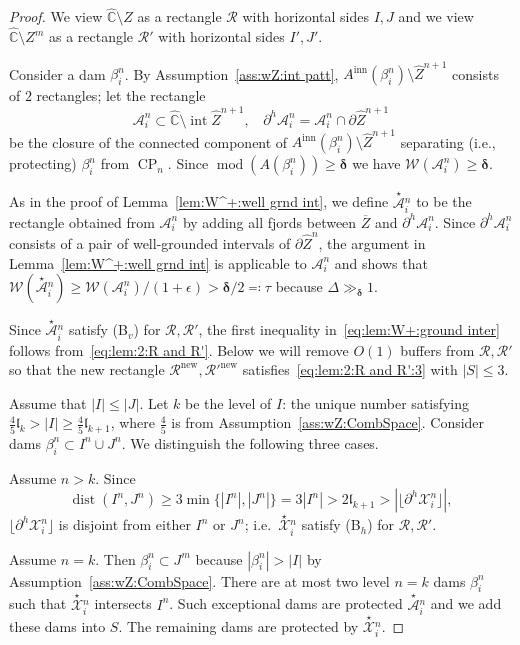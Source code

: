 \documentclass{amsart}
\renewcommand{\sp}{{\ \ }}
\newcommand{\1}{{\mathbb 1 }}
\newcommand{\upstar}[1]{\overset{\star}{ #1}{}}
\newcommand{\Width}{{\mathcal W}}
\newcommand{\bDelta}{{\mathbb{\Delta}}}
\newcommand\RR{\mathcal{R}}
\newcommand\XX{\mathcal{X}}
\newcommand\intr{\operatorname{int}}
\newcommand{\wZ}{{\widehat Z}}
\newcommand{\length}{{\mathfrak l}}
\newcommand\inn{{\operatorname{inn}}}
\renewcommand\AA{\mathcal{A}}
\newcommand\new{{\operatorname{new}}}
\newcommand{\wC}{\widehat{\mathbb{C}}}
\theoremstyle{remark}
\numberwithin{equation}{section}
\theoremstyle{definition}
\newcommand{\dist}{\operatorname{dist}}
\renewcommand{\mod}{\operatorname{mod}}
\newcommand{\CP}{{\operatorname{CP}}}
\newcommand{\bdelta}{{\boldsymbol{ \delta}}}
\begin{document}
\begin{proof}We view $\wC\setminus Z$ as a rectangle $\RR$ with horizontal sides $I,J$ and we view $\wC\setminus Z^m$ as a rectangle $\RR'$ with horizontal sides $I',J'$.

Consider a dam $\beta^n_i$. By Assumption~\ref{ass:wZ:int patt}, $A^\inn(\beta^n_i)\setminus \wZ^{n+1}$ consists of $2$ rectangles; let the rectangle \[\AA^n_i\subset \wC\setminus \intr \wZ^{n+1},\sp\sp \partial^h \AA^n_i=\AA^n_i\cap \partial \wZ^{n+1}\]
be the closure of the connected component of $A^\inn(\beta^n_i)\setminus \wZ^{n+1}$ separating (i.e., protecting) $\beta^n_i$ from $\CP_n$. Since $\mod (A(\beta^n_i))\ge \bdelta$ we have $\Width(\AA^n_i)\ge \bdelta$.

As in the proof of Lemma~\ref{lem:W^+:well grnd int}, we define $\upstar \AA^n_i$ to be the rectangle obtained from  $\AA^n_i$ by adding all fjords between $\overline Z$ and $\partial ^h \AA^n_i$. Since $\partial^h \AA^n_i$ consists of a pair of well-grounded intervals of $\partial \wZ^n$, the argument in Lemma~\ref{lem:W^+:well grnd int} is applicable to $\AA^n_i$ and shows that $\Width\left(\upstar \AA^n_i\right) \ge \Width (\AA^n_i)/(1+\epsilon) > \bdelta/2\eqqcolon \tau$ because  $\bDelta\gg_{\bdelta} 1 $.

Since $\upstar \AA^n_i$ satisfy (B${}_{v}$) for $\RR,\RR'$, the first inequality in~\eqref{eq:lem:W+:ground inter} follows from~\eqref{eq:lem:2:R and R'}. Below we will remove $O(1)$ buffers from $\RR,\RR'$ so that the new rectangle $\RR^\new, \RR'^\new$ satisfies~\eqref{eq:lem:2:R and R':3} with $|S|\le 3$.

Assume that $|I|\le |J|$. Let $k$ be the level of $I$: the unique number satisfying $\frac 4 5 \length_{k} > |I|\ge \frac 4 5\length_{k+1}$, where $\frac 4 5 $ is from Assumption~\ref{ass:wZ:CombSpace}. Consider dams $\beta^n_i\subset I^n\cup J^n$. We distinguish the following three cases.

Assume $n>k$. Since 
\[\dist(I^n,J^n)\ge 3 \min\{|I^n|,|J^n|\}=3|I^n|> 2\length_{k+1}>|\lfloor \partial ^h \XX^n_i\rfloor |,\]
$\lfloor  \partial ^h \XX^n_i\rfloor$ is disjoint from either $I^n$ or $ J^n$; i.e.~$\upstar \XX^n_i$ satisfy (B${}_{h}$) for $\RR,\RR'$.


 Assume $n=k$. Then $\beta^n_i\subset J^m$ because $|\beta^n_i|>|I|$ by Assumption~\ref{ass:wZ:CombSpace}. There are at most two level $n=k$ dams $\beta^n_i$ such that $\upstar \XX^n_i$ intersects $I^n$. Such exceptional dams are protected $\upstar \AA^n_i$ and we add these dams into $S$. The remaining dams are protected by $\upstar \XX^n_i$.
 

\end{proof}
\end{document}
